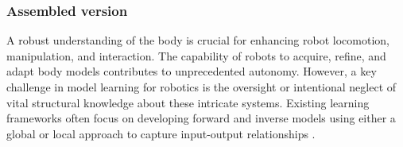 \documentclass[12pt, a4paper]{article}
\begin{document}

\newpage
\subsubsection*{Assembled version}

A robust understanding of the body is crucial for enhancing robot locomotion, manipulation, and interaction. The capability of robots to acquire, refine, and adapt body models contributes to unprecedented autonomy. However, a key challenge in model learning for robotics is the oversight or intentional neglect of vital structural knowledge about these intricate systems. Existing learning frameworks often focus on developing forward and inverse models using either a global or local approach to capture input-output relationships \cite{NguyenTuong2011Modellearningrobot}.
\end{document}
